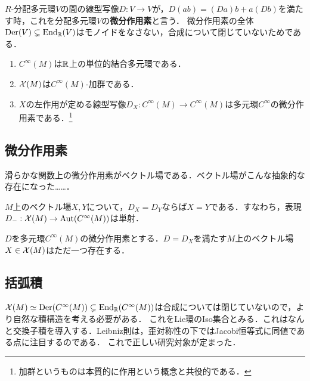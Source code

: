 \documentclass[uplatex,dvipdfmx]{jsreport}
\begin{document}
\begin{definition}[derivation]
    $R$-分配多元環$V$の間の線型写像$D:V\to V$が，$D(ab)=(Da)b+a(Db)$を満たす時，これを分配多元環$V$の\textbf{微分作用素}と言う．
    微分作用素の全体$\mathrm{Der}(V)\subsetneq\mathrm{End}_{\mathbb{R}}(V)$はモノイドをなさない，合成について閉じていないためである．
\end{definition}

\begin{example}\mbox{}
    \begin{enumerate}
        \item $C^\infty(M)$は$\mathbb{R}$上の単位的結合多元環である．
        \item $\mathcal{X}(M)$は$C^\infty(M)$-加群である．
        \item $X$の左作用が定める線型写像$D_X:C^\infty(M)\to C^\infty(M)$は多元環$C^\infty$の微分作用素である．\footnote{加群というものは本質的に作用という概念と共役的である．}
    \end{enumerate}
\end{example}

\subsection{微分作用素}

\begin{tcolorbox}[colframe=ForestGreen, colback=ForestGreen!10!white,breakable,colbacktitle=ForestGreen!40!white,coltitle=black,fonttitle=\bfseries\sffamily,
title=derivations of smooth functions are vector fields ]
    滑らかな関数上の微分作用素がベクトル場である．ベクトル場がこんな抽象的な存在になった……．
\end{tcolorbox}

\begin{lemma}
    $M$上のベクトル場$X,Y$について，$D_X=D_Y$ならば$X=Y$である．すなわち，表現$D_-:\mathcal{X}(M)\to\mathrm{Aut}(C^\infty(M))$は単射．
\end{lemma}

\begin{theorem}\label{thm-vector-field-and-derivation}
    $D$を多元環$C^\infty(M)$の微分作用素とする．$D=D_X$を満たす$M$上のベクトル場$X\in\mathcal{X}(M)$はただ一つ存在する．
\end{theorem}

\subsection{括弧積}

\begin{tcolorbox}[colframe=ForestGreen, colback=ForestGreen!10!white,breakable,colbacktitle=ForestGreen!40!white,coltitle=black,fonttitle=\bfseries\sffamily,
title=滑らかなベクトル場の全体はLie環をなす]
    $\mathcal{X}(M)\simeq\mathrm{Der}(C^\infty(M))\subsetneq\mathrm{End}_{\mathbb{R}}(C^\infty(M))$は合成については閉じていないので，より自然な積構造を考える必要がある．
    これをLie環のIso集合とみる．これはなんと交換子積を導入する．Leibniz則は，歪対称性の下ではJacobi恒等式に同値である点に注目するのである．
    これで正しい研究対象が定まった．
\end{tcolorbox}
\end{document}
